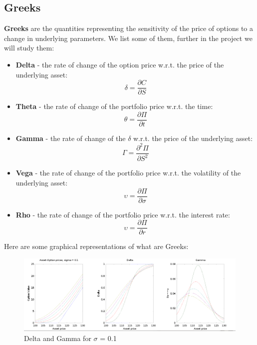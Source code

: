 \documentclass[a4paper]{report}
\begin{document}
\begin{itemize}
\section{Greeks}
\textbf{Greeks} are the quantities representing the sensitivity of the price of
options to a change in underlying parameters. We list some of them, further in the project we will study them:
\begin{itemize}
\item \textbf{Delta} - the rate of change of the option price w.r.t. the price of the underlying asset:
\begin{equation}
\delta = \frac{\partial C}{\partial S}
\end{equation}
\item \textbf{Theta} - the rate of change of the portfolio price w.r.t. the time:
\begin{equation}
\theta = \frac{\partial \Pi}{\partial t}
\end{equation}
\item \textbf{Gamma} - the rate of change of the $\delta$  w.r.t. the price of the underlying asset:
\begin{equation}
\Gamma = \frac{\partial^2 \Pi}{\partial S^2}
\end{equation}
\item \textbf{Vega} - the rate of change of the portfolio price w.r.t. the volatility of the underlying asset:
\begin{equation}
\upsilon = \frac{\partial \Pi}{\partial \sigma}
\end{equation}
\item \textbf{Rho} - the rate of change of the portfolio price w.r.t. the interest rate:
\begin{equation}
\upsilon = \frac{\partial \Pi}{\partial r}
\end{equation}
\end{itemize}
Here are some graphical representations of what are Greeks:
\begin{figure}[H]
    \centering
    \includegraphics[width=\textwidth]{octave1.png}
    \caption{Delta and Gamma for $\sigma$ = 0.1 }
\end{figure}


\end{itemize}
\end{document}
